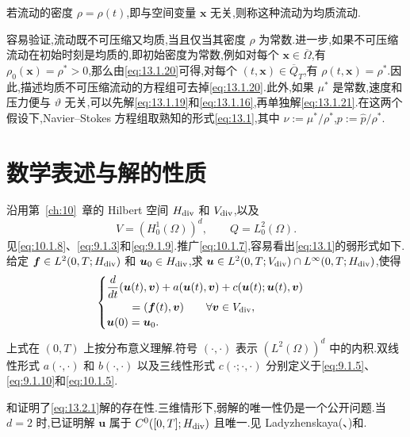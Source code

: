 \begin{definition*}
若流动的密度 \(\rho=\rho(t)\),即与空间变量 \(\boldsymbol{x}\) 无关,则称这种流动为{\heiti 均质流动}.
\end{definition*}
容易验证,流动既不可压缩又均质,当且仅当其密度 \(\rho\) 为常数.进一步,如果不可压缩流动在初始时刻是均质的,即初始密度为常数,例如对每个 \(\boldsymbol{x}\in\overline\Omega\),有 \(\rho_0(\boldsymbol{x})=\rho^*>0\),那么由\eqref{eq:13.1.20}可得,对每个 \((t,\boldsymbol{x})\in\overline Q_T\),有 \(\rho(t,\boldsymbol{x})=\rho^*\).因此,描述均质不可压缩流动的方程组可去掉\eqref{eq:13.1.20}.此外,如果 \(\mu^*\) 是常数,速度和压力便与 \(\vartheta\) 无关,可以先解\eqref{eq:13.1.19}和\eqref{eq:13.1.16},再单独解\eqref{eq:13.1.21}.在这两个假设下,Navier--Stokes 方程组取熟知的形式\eqref{eq:13.1},其中 \(\nu:=\mu^*/\rho^*\),\(p:=\widehat p/\rho^*\).

\section{数学表述与解的性质}\label{sec:13.2}

沿用第~\ref{ch:10}~章的 Hilbert 空间 \(H_{\rm div}\) 和 \(V_{\rm div}\),以及
\[
  V=(H_0^1(\Omega))^d,\qquad Q=L_0^2(\Omega).
\]
见\eqref{eq:10.1.8}、\eqref{eq:9.1.3}和\eqref{eq:9.1.9}.推广\eqref{eq:10.1.7},容易看出\eqref{eq:13.1}的弱形式如下.给定 \(\boldsymbol{f}\in L^2(0,T;H_{\rm div})\) 和 \(\boldsymbol{u}_0\in H_{\rm div}\),求 \(\boldsymbol{u}\in L^2(0,T;V_{\rm div})\cap L^\infty(0,T;H_{\rm div})\),使得
\begin{equation}\label{eq:13.2.1}
  \begin{cases}
    \begin{aligned}
      &\dfrac{d}{dt}(\boldsymbol{u}(t),\boldsymbol{v})+a(\boldsymbol{u}(t),\boldsymbol{v})
       +c(\boldsymbol{u}(t);\boldsymbol{u}(t),\boldsymbol{v})\\
      &\qquad=(\boldsymbol{f}(t),\boldsymbol{v})\qquad\forall\boldsymbol{v}\in V_{\rm div},
    \end{aligned}\\[2pt]
    \boldsymbol{u}(0)=\boldsymbol{u}_0.
  \end{cases}
\end{equation}
上式在 \((0,T)\) 上按分布意义理解.符号 \((\cdot,\cdot)\) 表示 \((L^2(\Omega))^d\) 中的内积.双线性形式 \(a(\cdot,\cdot)\) 和 \(b(\cdot,\cdot)\) 以及三线性形式 \(c(\cdot;\cdot,\cdot)\) 分别定义于\eqref{eq:9.1.5}、\eqref{eq:9.1.10}和\eqref{eq:10.1.5}.

和证明了\eqref{eq:13.2.1}解的存在性.三维情形下,弱解的唯一性仍是一个公开问题.当 \(d=2\) 时,已证明解 \(\boldsymbol{u}\) 属于 \(C^0([0,T];H_{\rm div})\) 且唯一.见 Ladyzhenskaya(、)和.

